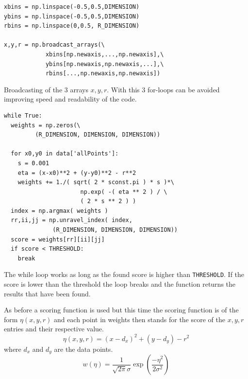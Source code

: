 \documentclass[11pt]{scrreprt}
\begin{document}
\begin{codesnippet}[htbp]
  \begin{lstlisting}
xbins = np.linspace(-0.5,0.5,DIMENSION)
ybins = np.linspace(-0.5,0.5,DIMENSION)
rbins = np.linspace(0,0.5, R_DIMENSION)

x,y,r = np.broadcast_arrays(\
            xbins[np.newaxis,...,np.newaxis],\
            ybins[np.newaxis,np.newaxis,...],\
            rbins[...,np.newaxis,np.newaxis])
\end{lstlisting}
\caption[3D broadcasting]{Broadcasting of the 3 arrays $x,y,r$. With this 3 for-loops can be avoided improving speed and readability
of the code.}
\label{pc:3D_broadcasting}
\end{codesnippet}

\begin{codesnippet}[htbp]
  \begin{lstlisting}
while True:
  weights = np.zeros(\
         (R_DIMENSION, DIMENSION, DIMENSION))

  for x0,y0 in data['allPoints']:
    s = 0.001
    eta = (x-x0)**2 + (y-y0)**2 - r**2
    weights += 1./( sqrt( 2 * sconst.pi ) * s )*\
                      np.exp( -( eta ** 2 ) / \
                      ( 2 * s ** 2 ) )
  index = np.argmax( weights )
  rr,ii,jj = np.unravel_index( index, 
              (R_DIMENSION, DIMENSION, DIMENSION))
  score = weights[rr][ii][jj]
  if score < THRESHOLD:
    break  
\end{lstlisting}
\caption[Calculation of weights and threshold check for 3D HT]{The while loop works as long as the found score is higher than
\texttt{THRESHOLD}. If the score is lower than the threshold the loop breaks and the function returns the results that have been found.}
\label{pc:3D_threshold}
\end{codesnippet}

As before a scoring function is used but this time the scoring function is of the form $\eta(x,y,r)$ and each point in weights then stands
for the score of the $x,y,r$ entries and their respective value.
\begin{equation}
  \eta(x,y,r) = (x - d_x)^2 + (y - d_y) - r ^ 2
\end{equation}
where $d_x$ and $d_y$ are the data points.
\begin{equation}
  w(\eta) = \frac{1}{\sqrt{2\pi}\sigma}\exp\left( \frac{-\eta^2}{2\sigma^2}\right)
\end{equation}
\end{document}
